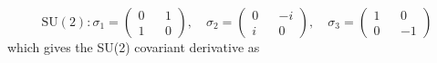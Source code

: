 \begin{equation}
  \mathrm{SU(2)}:
  \sigma_{1} =\begin{pmatrix}0&&1\\1&&0\end{pmatrix},\quad
    \sigma_{2} =\begin{pmatrix}0&&-i\\i&&0\end{pmatrix},\quad
    \sigma_{3} =\begin{pmatrix}1&&0\\0&&-1\end{pmatrix}
\end{equation}
which gives the SU(2) covariant derivative as

